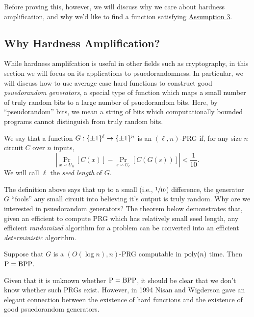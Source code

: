 \documentclass[11pt]{article}
\begin{document}
Before proving this, however, we will discuss why we care about hardness amplification, and why we'd like to find a function satisfying \hyperref[a-3]{Assumption 3}.

\subsection{Why Hardness Amplification?}

While hardness amplifcation is useful in other fields such as cryptography, in this section we will focus on its applications to psuedorandomness. In particular, we will discuss how to use average case hard functions to construct good \emph{psuedorandom generators}, a special type of function which maps a small number of truly random bits to a large number of psuedorandom bits. Here, by ``pseudorandom'' bits, we mean a string of bits which computationally bounded programs cannot distinguish from truly random bits.

\begin{definition}{2.1}
    We say that a function $G : \{\pm 1\}^\ell \rightarrow \{\pm 1\}^{n}$ is an $(\ell, n)$-PRG if, for any size $n$ circuit $C$ over $n$ inputs, 
    \begin{equation*}
        \left|\Pr_{x \backsim U_n}[C(x)] - \Pr_{s \backsim U_\ell}[C(G(s))]\right| < \frac{1}{10}.
    \end{equation*}
    We will call $\ell$ the \emph{seed length} of $G$.
\end{definition}

The definition above says that up to a small (i.e., $\sfrac{1}{10}$) difference, the generator $G$ ``fools'' any small circuit into believing it's output is truly random. Why are we interested in psuedorandom generators? The theorem below demonstrates that, given an efficient to compute PRG which has relatively small seed length, any efficient \emph{randomized} algorithm for a problem can be converted into an efficient \emph{deterministic} algorithm.


\begin{theorem}{2.2} \label{t-2-2}
    Suppose that $G$ is a $(O(\log n), n)$-PRG computable in $\mathrm{poly}(n)$ time. Then $\mathrm{P} = \textup{BPP}$.
\end{theorem}

Given that it is unknown whether $\mathrm{P} = \textup{BPP}$, it should be clear that we don't know whether such PRGs exist. However, in 1994 Nisan and Wigderson \cite{NW94} gave an elegant connection between the existence of hard functions and the existence of good psuedorandom generators.
\end{document}
